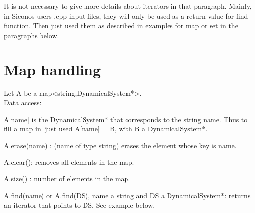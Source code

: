 \documentclass[10pt]{article}
\begin{document}
It is not necessary to give more details about iterators in that paragraph. Mainly, in Siconos users .cpp input files, they will only be used as a return value for find 
function. Then just used them as described in examples for map or set in the paragraphs below.

\section{Map handling}

Let A be a map<string,DynamicalSystem*>. \\

Data access: 
\bei
\item A[name] is the DynamicalSystem* that corresponds to the string name. Thus to fill a map in, just used A[name] = B, with B a DynamicalSystem*. 
\item A.erase(name) : (name of type string) erases the element whose key is name. 
\item A.clear(): removes all elements in the map. 
\item A.size() : number of elements in the map. 
\item A.find(name) or A.find(DS), name a string and DS a DynamicalSystem*: returns an iterator that points to DS. See example below.
\ei
\end{document}

